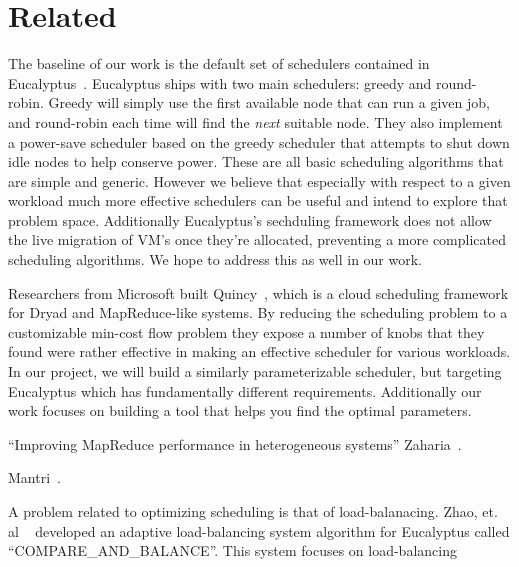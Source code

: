 \section{Related}



The baseline of our work is the default set of schedulers contained in
Eucalyptus~\cite{Eucalyptus}.  Eucalyptus ships with two main schedulers: greedy
and round-robin.  Greedy will simply use the first available node that can run a
given job, and round-robin each time will find the \emph{next} suitable node.
They also implement a power-save scheduler based on the greedy scheduler that
attempts to shut down idle nodes to help conserve power.  These are all basic
scheduling algorithms that are simple and generic.  However we believe that
especially with respect to a given workload much more effective schedulers can
be useful and intend to explore that problem space.  Additionally Eucalyptus's
sechduling framework does not allow the live migration of VM's once they're
allocated, preventing a more complicated scheduling algorithms.  We hope to
address this as well in our work.

Researchers from Microsoft built Quincy~\cite{Quincy}, which is a cloud
scheduling framework for Dryad and MapReduce-like systems.  By reducing the
scheduling problem to a customizable min-cost flow problem they expose a number
of knobs that they found were rather effective in making an effective scheduler
for various workloads.  In our project, we will build a similarly
parameterizable scheduler, but targeting Eucalyptus which has fundamentally
different requirements.  Additionally our work focuses on building a tool that
helps you find the optimal parameters.

``Improving MapReduce performance in heterogeneous systems'' Zaharia~\cite{Zaharia}.

Mantri~\cite{Mantri}.

A problem related to optimizing scheduling is that of load-balanacing.  Zhao,
et. al ~\cite{Zhao} developed an adaptive load-balancing system algorithm for
Eucalyptus called ``COMPARE\_AND\_BALANCE''.  This system focuses on
load-balancing 
